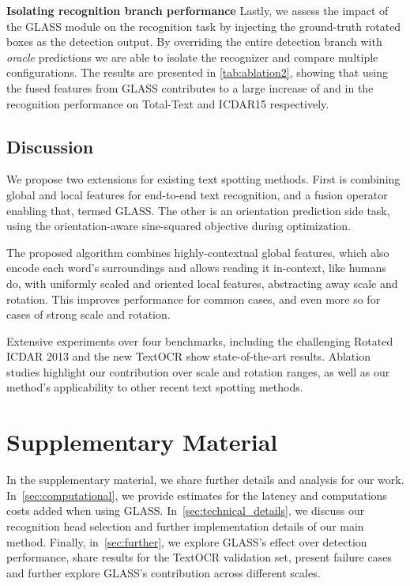 \documentclass[runningheads]{llncs}
\begin{document}
\noindent \textbf{Isolating recognition branch performance}
Lastly, we assess the impact of the GLASS module on the recognition task by injecting the ground-truth rotated boxes as the detection output.
By overriding the entire detection branch with \emph{oracle} predictions we are able to isolate the recognizer and compare multiple configurations.
The results are presented in \cref{tab:ablation2}, showing that using the fused features from GLASS contributes to a large increase of  and  in the recognition performance on Total-Text and ICDAR15 respectively.
 

\section{Discussion}
\label{sec:discussion}

We propose two extensions for existing text spotting methods. First is combining global and local features for end-to-end text recognition, and a fusion operator enabling that, termed GLASS.
The other is an orientation prediction side task, using the orientation-aware sine-squared objective during optimization.

The proposed algorithm combines highly-contextual global features, which also encode each word's surroundings and allows reading it in-context, like humans do, with uniformly scaled and oriented local features, abstracting away scale and rotation. This improves performance for common cases, and even more so for cases of strong scale and rotation.

Extensive experiments over four benchmarks, including the challenging Rotated ICDAR 2013 and the new TextOCR show state-of-the-art results.
Ablation studies highlight our contribution over scale and rotation ranges, as well as our method's applicability to other recent text spotting methods.
 
\clearpage







\chapter*{Supplementary Material}




In the supplementary material, we share further details and analysis for our work.
In~\cref{sec:computational}, we provide estimates for the latency and computations costs added when using GLASS.
In~\cref{sec:technical_details}, we discuss our recognition head selection and further implementation details of our main method.
Finally, in~\cref{sec:further}, we explore GLASS's effect over detection performance, share results for the TextOCR validation set, present failure cases and further explore GLASS's contribution across different scales.
\end{document}
